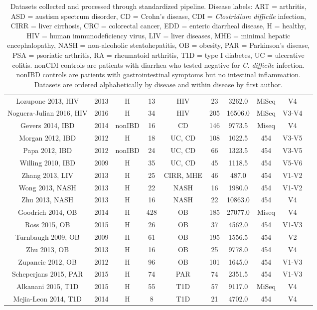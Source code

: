 {\begin{table}[h]
{\begin{tabular}{c c c c c c c c c c}
	Lozupone 2013, HIV & 2013 & H & 13 & HIV & 23 & 3262.0 & MiSeq & V4 & \cite{lozupone2013alterations} \\
	Noguera-Julian 2016, HIV & 2016 & H & 34 & HIV & 205 & 16506.0 & MiSeq & V3-V4 & \cite{noguera2016gut} \\
	Gevers 2014, IBD & 2014 & nonIBD & 16 & CD & 146 & 9773.5 & Miseq & V4 & \cite{ibd-gevers} \\
	Morgan 2012, IBD & 2012 & H & 18 & UC, CD & 108 & 1022.5 & 454 & V3-V5 & \cite{ibd-hut} \\
	Papa 2012, IBD & 2012 & nonIBD & 24 & UC, CD & 66 & 1323.5 & 454 & V3-V5 & \cite{ibd-papa} \\
	Willing 2010, IBD & 2009 & H & 35 & UC, CD & 45 & 1118.5 & 454 & V5-V6 & \cite{ibd-engstrand} \\
	Zhang 2013, LIV & 2013 & H & 25 & CIRR, MHE & 46 & 487.0 & 454 & V1-V2 & \cite{mhe-zhang} \\
	Wong 2013, NASH & 2013 & H & 22 & NASH & 16 & 1980.0 & 454 & V1-V2 & \cite{nash-chan} \\
	Zhu 2013, NASH & 2013 & H & 16 & NASH & 22 & 10863.0 & 454 & V4 & \cite{nash-baker} \\
	Goodrich 2014, OB & 2014 & H & 428 & OB & 185 & 27077.0 & Miseq & V4 & \cite{ob-goodrich} \\
	Ross 2015, OB & 2015 & H & 26 & OB & 37 & 4562.0 & 454 & V1-V3 & \cite{ob-ross} \\
	Turnbaugh 2009, OB & 2009 & H & 61 & OB & 195 & 1556.5 & 454 & V2 & \cite{ob-gordon} \\
	Zhu 2013, OB & 2013 & H & 16 & OB & 25 & 9778.0 & 454 & V4 & \cite{nash-baker} \\
	Zupancic 2012, OB & 2012 & H & 96 & OB & 101 & 1645.0 & 454 & V1-V3 & \cite{ob-zupancic} \\
	Scheperjans 2015, PAR & 2015 & H & 74 & PAR & 74 & 2351.5 & 454 & V1-V3 & \cite{par-schep} \\
	Alkanani 2015, T1D & 2015 & H & 55 & T1D & 57 & 9117.0 & MiSeq & V4 & \cite{t1d-alkanani} \\
	Mejia-Leon 2014, T1D & 2014 & H & 8 & T1D & 21 & 4702.0 & 454 & V4 & \cite{t1d-mejia} \\ 	\hline
\end{tabular}}
\caption{Datasets collected and processed through standardized pipeline. Disease labels: ART = arthritis, ASD = austism spectrum disorder, CD = Crohn's disease, CDI = \textit{Clostridium difficile} infection, CIRR = liver cirrhosis, CRC = colorectal cancer, EDD = enteric diarrheal disease, H = healthy, HIV = human immunodeficiency virus, LIV = liver diseases,  MHE =  minimal hepatic encephalopathy, NASH = non-alcoholic steatohepatitis, OB = obesity, PAR = Parkinson's disease, PSA = psoriatic arthritis, RA = rheumatoid arthritis, T1D = type I diabetes, UC = ulcerative colitis. nonCDI controls are patients with diarrhea who tested negative for \textit{C. difficile} infection. nonIBD controls are patients  with gastrointestinal symptoms but no intestinal inflammation. Datasets are ordered alphabetically by disease and within disease by first author.}\label{tab:datasets_full_info}
\end{table}
}

